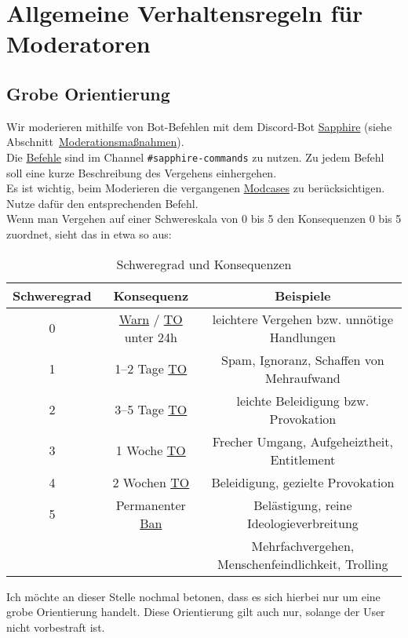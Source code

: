 \documentclass[a4paper,12pt]{article}
\begin{document}
\section{Allgemeine Verhaltensregeln für Moderatoren}
\label{sec:modregeln}
\subsection{Grobe Orientierung}
Wir moderieren mithilfe von Bot-Befehlen mit dem Discord-Bot \hyperlink{term:sapphire}{Sapphire} (siehe Abschnitt~\hyperlink{sec:sapphire}{Moderationsmaßnahmen}).\\
Die \hyperlink{term:command}{Befehle} sind im Channel \texttt{\#sapphire-commands} zu nutzen. Zu jedem Befehl soll eine kurze Beschreibung des Vergehens einhergehen.\\
Es ist wichtig, beim Moderieren die vergangenen \hyperlink{term:case}{Modcases} zu berücksichtigen. Nutze dafür den entsprechenden Befehl.\\
Wenn man Vergehen auf einer Schwereskala von 0 bis 5 den Konsequenzen 0 bis 5 zuordnet, sieht das in etwa so aus:
\begin{table}[H]
    \centering
    \caption{Schweregrad und Konsequenzen}
    \label{tab:schweregrad}
    \begin{tabular}{|c|c|c|}
        \hline
        \textbf{Schweregrad} & \textbf{Konsequenz} & \textbf{Beispiele} \\
        \hline
        0 & \hyperlink{term:warn}{Warn} / \hyperlink{term:to}{TO} unter 24h & leichtere Vergehen bzw. unnötige Handlungen\\ \hline
        1 & 1--2 Tage \hyperlink{term:to}{TO} & Spam, Ignoranz, Schaffen von Mehraufwand \\ \hline
        2 & 3--5 Tage \hyperlink{term:to}{TO} & leichte Beleidigung bzw. Provokation \\ \hline
        3 & 1 Woche \hyperlink{term:to}{TO} & Frecher Umgang, Aufgeheiztheit, Entitlement \\ \hline
        4 & 2 Wochen \hyperlink{term:to}{TO} & Beleidigung, gezielte Provokation \\ \hline
        5 & Permanenter \hyperlink{term:ban}{Ban} & Belästigung, reine Ideologieverbreitung \\
          &               & Mehrfachvergehen, Menschenfeindlichkeit, Trolling \\
        \hline
    \end{tabular}
\end{table}
Ich möchte an dieser Stelle nochmal betonen, dass es sich hierbei nur um eine grobe Orientierung handelt. Diese Orientierung
gilt auch nur, solange der User nicht vorbestraft ist.\\ 
\end{document}
